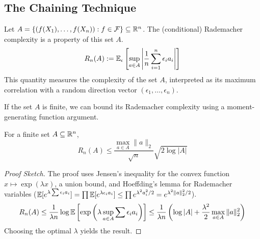 \subsection{The Chaining Technique}


Let $A = \{ (f(X_1), \dots, f(X_n)) : f \in \mathcal{F} \} \subseteq \mathbb{R}^n$. The (conditional) Rademacher complexity is a property of this set $A$.
$$ R_n(A) := \mathbb{E}_{\epsilon}\left[ \sup_{a \in A} \left| \frac{1}{n} \sum_{i=1}^n \epsilon_i a_i \right| \right] $$
This quantity measures the complexity of the set $A$, interpreted as its maximum correlation with a random direction vector $(\epsilon_1, \dots, \epsilon_n)$.

If the set $A$ is finite, we can bound its Rademacher complexity using a moment-generating function argument.
\begin{lem}
For a finite set $A \subseteq \mathbb{R}^n$,
$$ R_n(A) \le \frac{\max_{a \in A} \|a\|_2}{\sqrt{n}} \sqrt{2 \log |A|} $$
\end{lem}
\begin{proof}[Proof Sketch]
The proof uses Jensen's inequality for the convex function $x \mapsto \exp(\lambda x)$, a union bound, and Hoeffding's lemma for Rademacher variables ($\mathbb{E}[e^{\lambda \sum \epsilon_i a_i}] = \prod \mathbb{E}[e^{\lambda \epsilon_i a_i}] \le \prod e^{\lambda^2 a_i^2/2} = e^{\lambda^2 \|a\|_2^2/2}$).
$$ R_n(A) \le \frac{1}{\lambda n} \log \mathbb{E} \left[ \exp\left(\lambda \sup_{a \in A} \sum \epsilon_i a_i\right) \right] \le \frac{1}{\lambda n} \left( \log|A| + \frac{\lambda^2}{2} \max_{a \in A} \|a\|_2^2 \right) $$
Choosing the optimal $\lambda$ yields the result.
\end{proof}

